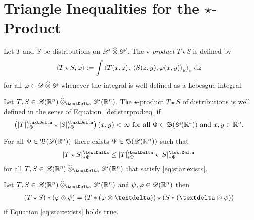 \section{Triangle Inequalities for the $\star$-Product}
\label{tri}

\begin{definition}
    Let $ T $ and $ S $ be distributions on $ \mathscr{  D  }' \mathbin{\widehat{\otimes}} \mathscr{  D  }' $.
    The {\em $\star$-product} $ T \star S $ is defined by
    \begin{align}
        \langle  T \star S  ,  \varphi  \rangle
        :=
        \int \left\langle  T( x, z )  \,,\,  \langle  S( z, y )  ,  \varphi( x, y )  \rangle_y  \right\rangle_x \,\mathrm{ d }{  z  }
        \label{def:starprod:eq}
    \end{align}
    for all $ \varphi \in \mathscr{  D  } \mathbin{\widehat{\otimes}} \mathscr{  D  } $
    whenever the integral is well defined as a Lebesgue integral.
\end{definition}

\begin{conjecture}
    Let $ T, S \in \fsSmobnd(\nrR^n) \cteproDi \fsDis(\nrR^n) $.
    The $\star$-product $ T \star S $ of distributions
    is well defined in the sense of Equation~\eqref{def:starprod:eq} if
    \begin{align}
        \left( \snfDiCo{ T }{ \Ph } \star \snfDiCo{ S }{ \Ph } \right)( x, y )
        <
        \infi
        ~\text{for all $ \Ph \in \ssBnd(\fsTest(\nrR^n)) $
        and $ x, y \in \nrR^n $.}
        \label{eq:star:exists}
    \end{align}
\end{conjecture}

\begin{conjecture}
    For all $ \Phi \in \operatorname{\mathfrak{ B }}(\mathscr{  D  }(\mathbb{ R }^n)) $
    there exists $ \Psi \in \operatorname{\mathfrak{ B }}(\mathscr{  D  }(\mathbb{ R }^n)) $ such that
    \begin{align}
        \snfDiCo{ T \star S }{ \Ph }
        \leq
        \snfDiCo{ T }{ \Ps } \star \snfDiCo{ S }{ \Ps }
        \label{eq:star:ineq}
    \end{align}
    for all $ T, S \in \fsSmobnd(\nrR^n) \cteproDi \fsDis(\nrR^n) $
    that satisfy \eqref{eq:star:exists}.
\end{conjecture}

\begin{lemma}
    Let $ T, S \in \fsSmobnd(\nrR^n) \cteproDi \fsDis(\nrR^n) $
    and $ \psi,\varphi \in \mathscr{  D  }(\mathbb{ R }^n) $ then
    \begin{align}
        ( T \star S ) \conv ( \ph \tepro \ps )
        =
        ( T \conv ( \ph \tepro \sfdeo ) ) \star ( S \conv ( \sfdeo \tepro \ps ) )
    \end{align}
    if Equation \eqref{eq:star:exists} holds true.
\end{lemma}

